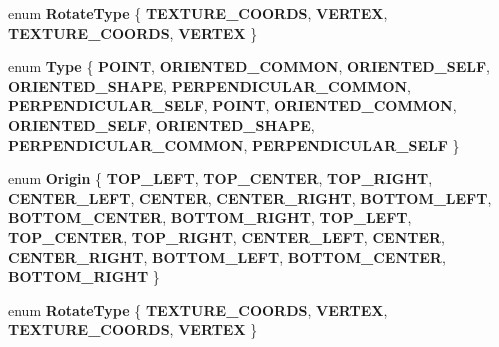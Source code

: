 \begin{DoxyCompactItemize}
\mbox{\label{classPUParticle3DQuadRender_aeb55583f3332d4d1b3a4cd8a43324670}} 
enum {\bfseries Rotate\+Type} \{ {\bfseries T\+E\+X\+T\+U\+R\+E\+\_\+\+C\+O\+O\+R\+DS}, 
{\bfseries V\+E\+R\+T\+EX}, 
{\bfseries T\+E\+X\+T\+U\+R\+E\+\_\+\+C\+O\+O\+R\+DS}, 
{\bfseries V\+E\+R\+T\+EX}
 \}
\item 
\mbox{\label{classPUParticle3DQuadRender_adafb7cfaacc368932721838dff58fc3e}} 
enum {\bfseries Type} \{ \newline
{\bfseries P\+O\+I\+NT}, 
{\bfseries O\+R\+I\+E\+N\+T\+E\+D\+\_\+\+C\+O\+M\+M\+ON}, 
{\bfseries O\+R\+I\+E\+N\+T\+E\+D\+\_\+\+S\+E\+LF}, 
{\bfseries O\+R\+I\+E\+N\+T\+E\+D\+\_\+\+S\+H\+A\+PE}, 
\newline
{\bfseries P\+E\+R\+P\+E\+N\+D\+I\+C\+U\+L\+A\+R\+\_\+\+C\+O\+M\+M\+ON}, 
{\bfseries P\+E\+R\+P\+E\+N\+D\+I\+C\+U\+L\+A\+R\+\_\+\+S\+E\+LF}, 
{\bfseries P\+O\+I\+NT}, 
{\bfseries O\+R\+I\+E\+N\+T\+E\+D\+\_\+\+C\+O\+M\+M\+ON}, 
\newline
{\bfseries O\+R\+I\+E\+N\+T\+E\+D\+\_\+\+S\+E\+LF}, 
{\bfseries O\+R\+I\+E\+N\+T\+E\+D\+\_\+\+S\+H\+A\+PE}, 
{\bfseries P\+E\+R\+P\+E\+N\+D\+I\+C\+U\+L\+A\+R\+\_\+\+C\+O\+M\+M\+ON}, 
{\bfseries P\+E\+R\+P\+E\+N\+D\+I\+C\+U\+L\+A\+R\+\_\+\+S\+E\+LF}
 \}
\item 
\mbox{\label{classPUParticle3DQuadRender_afa05e4913c569c21f4ff77bd95160924}} 
enum {\bfseries Origin} \{ \newline
{\bfseries T\+O\+P\+\_\+\+L\+E\+FT}, 
{\bfseries T\+O\+P\+\_\+\+C\+E\+N\+T\+ER}, 
{\bfseries T\+O\+P\+\_\+\+R\+I\+G\+HT}, 
{\bfseries C\+E\+N\+T\+E\+R\+\_\+\+L\+E\+FT}, 
\newline
{\bfseries C\+E\+N\+T\+ER}, 
{\bfseries C\+E\+N\+T\+E\+R\+\_\+\+R\+I\+G\+HT}, 
{\bfseries B\+O\+T\+T\+O\+M\+\_\+\+L\+E\+FT}, 
{\bfseries B\+O\+T\+T\+O\+M\+\_\+\+C\+E\+N\+T\+ER}, 
\newline
{\bfseries B\+O\+T\+T\+O\+M\+\_\+\+R\+I\+G\+HT}, 
{\bfseries T\+O\+P\+\_\+\+L\+E\+FT}, 
{\bfseries T\+O\+P\+\_\+\+C\+E\+N\+T\+ER}, 
{\bfseries T\+O\+P\+\_\+\+R\+I\+G\+HT}, 
\newline
{\bfseries C\+E\+N\+T\+E\+R\+\_\+\+L\+E\+FT}, 
{\bfseries C\+E\+N\+T\+ER}, 
{\bfseries C\+E\+N\+T\+E\+R\+\_\+\+R\+I\+G\+HT}, 
{\bfseries B\+O\+T\+T\+O\+M\+\_\+\+L\+E\+FT}, 
\newline
{\bfseries B\+O\+T\+T\+O\+M\+\_\+\+C\+E\+N\+T\+ER}, 
{\bfseries B\+O\+T\+T\+O\+M\+\_\+\+R\+I\+G\+HT}
 \}
\item 
\mbox{\label{classPUParticle3DQuadRender_aeb55583f3332d4d1b3a4cd8a43324670}} 
enum {\bfseries Rotate\+Type} \{ {\bfseries T\+E\+X\+T\+U\+R\+E\+\_\+\+C\+O\+O\+R\+DS}, 
{\bfseries V\+E\+R\+T\+EX}, 
{\bfseries T\+E\+X\+T\+U\+R\+E\+\_\+\+C\+O\+O\+R\+DS}, 
{\bfseries V\+E\+R\+T\+EX}
 \}
\end{DoxyCompactItemize}
